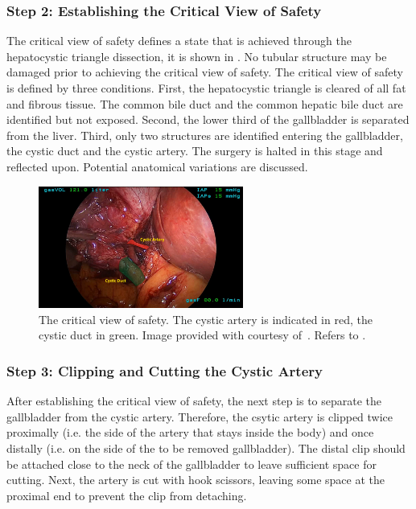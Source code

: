 \subsubsection{Step 2: Establishing the Critical View of Safety} 
\label{in:sec:critical_view_of_safety}
The critical view of safety defines a state that is achieved through the hepatocystic triangle dissection, it is shown in . No tubular structure may be damaged prior to achieving the critical view of safety. The critical view of safety is defined by three conditions. First, the hepatocystic triangle is cleared of all fat and fibrous tissue. The common bile duct and the common hepatic bile duct are identified but not exposed. Second, the lower third of the gallbladder is separated from the liver. Third, only two structures are identified entering the gallbladder, the cystic duct and the cystic artery. The surgery is halted in this stage and reflected upon. Potential anatomical variations are discussed.

\begin{figure}[tb]
    \centering
    \includegraphics[width=0.6\textwidth]{introduction/img/critical_view_of_safety.png}
    \caption{The critical view of safety. The cystic artery is indicated in red, the cystic duct in green. Image provided with courtesy of~\cite{ALES5766}. Refers to .}
    \label{fig:enter-label}
\end{figure}

\subsubsection{Step 3: Clipping and Cutting the Cystic Artery} After establishing the critical view of safety, the next step is to separate the gallbladder from the cystic artery. Therefore, the csytic artery is clipped twice proximally (i.e. the side of the artery that stays inside the body) and once distally (i.e. on the side of the to be removed gallbladder). The distal clip should be attached close to the neck of the gallbladder to leave sufficient space for cutting. Next, the artery is cut with hook scissors, leaving some space at the proximal end to prevent the clip from detaching.


